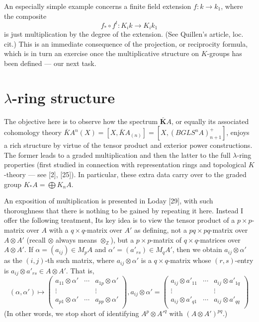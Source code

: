 \documentclass[openany,leqno]{book}  %
\newcommand{\Z}{\mathbb{Z}}
\begin{document}
An especially simple example concerns a finite field extension $f\colon  k\longrightarrow k_1$, where the composite 
\[f_*\circ f^t \colon K_ik \longrightarrow K_ik_1\]
is just multiplication by the degree of the extension. (See Quillen's article, loc. cit.) This is an immediate consequence of the projection, or reciprocity formula, which is in turn an exercise once the multiplicative structure on $K$-groups has been defined --- our next task.

\chapter{$\lambda$-ring structure} %
\label{cha:13lambda_ring_structure}
The objective here is to observe how the spectrum $\bar{\mathbf{K}}A$, or equally its associated cohomology theory $\bar{K}A^n(X) = [X, \bar{K}A_{(n)}]=[X,(BGLS^nA)^+_{n+1}]$, enjoys a rich structure by virtue of the tensor product and exterior power constructions. The former leads to a graded multiplication and then the latter to the full $\lambda$-ring properties (first studied in connection with representation rings and topological $K$-theory --- see [2], [25]). In particular, these extra data carry over to the graded group $K_*A = \bigoplus K_nA$.

An exposition of multiplication is presented in Loday [29], with such thoroughness that there is nothing to be gained by repeating it here. Instead I offer the following treatment, Its key idea is to view the tensor product of a $p\times p$-matrix over $A$ with a $q\times q$-matrix over $A'$ as defining, not a $pq\times pq$-matrix over $A \otimes A'$ (recall $\otimes$ always means $\otimes_\Z$), but a $p\times p$-matrix of $q\times q$-matrices over$ A \otimes A'$. If $\alpha = (a_{ij}) \in M_pA$ and $\alpha' = (a'_{rs}) \in M_qA'$, then we obtain $a_{ij}\otimes \alpha'$ as the $(i, j)$-th such matrix, where $a_{ij}\otimes \alpha'$ is a $q\times q$-matrix whose $(r, s)$-entry is $a_{ij}\otimes a'_{rs} \in A \otimes A'$. That is,
\[(\alpha,\alpha')\mapsto \begin{pmatrix}
  a_{11}\otimes \alpha' &\cdots & a_{1p}\otimes \alpha' \\
  \vdots & &\vdots \\
  a_{p1}\otimes \alpha' &\cdots & a_{pp}\otimes \alpha' \\
\end{pmatrix}, a_{ij}\otimes \alpha' =
\begin{pmatrix}
  a_{ij}\otimes a'_{11} &\cdots & a_{ij}\otimes a'_{1q} \\
  \vdots & &\vdots \\
  a_{ij}\otimes a'_{q1} &\cdots & a_{ij}\otimes a'_{qq} \\
\end{pmatrix}\]   
(In other words, we stop short of identifying $A^p\otimes {A'}^q$ with $(A \otimes A')^{pq}$.)
\end{document}
